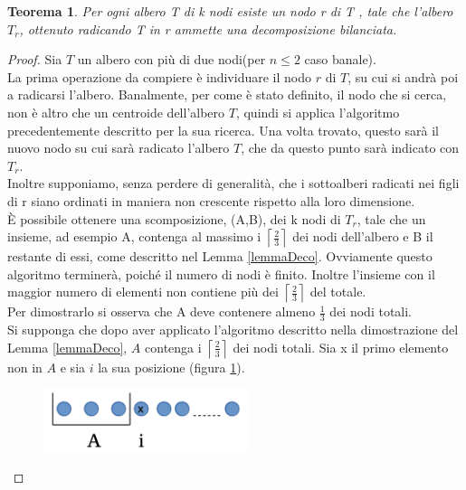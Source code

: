 \newtheorem{teorema1}[definizione]{Teorema}
\begin{teorema1}
Per ogni albero T di k nodi esiste un nodo r di T , tale che l'albero $T_r$, ottenuto radicando T in r ammette una decomposizione bilanciata.
\end{teorema1}
\begin{proof}
	Sia $ T $ un albero con pi\`u di due nodi(per $n\le2$ caso banale). \\
	La prima operazione da compiere \`e individuare il nodo $ r $ di $ T $, su cui si andr\`a poi a radicarsi l'albero.
	Banalmente, per come \`e stato definito, il nodo che si cerca, non \`e altro che  un centroide dell'albero $ T $, quindi si applica l’algoritmo precedentemente descritto per la sua ricerca.
	Una volta trovato, questo sar\`a il nuovo nodo su cui sar\`a radicato l'albero $ T $, che da questo punto sar\`a indicato con $T_r$.
	\\ 
	Inoltre supponiamo, senza perdere di generalit\`a, che i sottoalberi radicati nei figli di r siano ordinati in maniera non crescente rispetto alla loro dimensione.\\
	\`E possibile ottenere una scomposizione, (A,B), dei k nodi di $T_r$,  tale che un insieme, ad esempio A, contenga al massimo i $\left\lceil \frac{2}{3} \right\rceil$ dei nodi dell'albero e B il restante di essi, come descritto nel Lemma \ref{lemmaDeco}.
	Ovviamente questo algoritmo terminer\`a, poich\'e il numero di nodi \`e finito.
	Inoltre l'insieme con il maggior numero di elementi non contiene pi\`u dei $\left\lceil \frac{2}{3} \right\rceil$ del totale. \\
	Per dimostrarlo si osserva che A deve contenere almeno $\frac{1}{3}$ dei nodi totali. \\
	Si supponga che dopo aver applicato l'algoritmo descritto nella dimostrazione del Lemma \ref{lemmaDeco}, $ A $ contenga i  $ \left\lceil \frac{2}{3}\right\rceil $ dei nodi totali.
	Sia x il primo elemento non in $  A $ e sia $ i $ la sua posizione (figura \ref{fig:4}).
	\begin{figure}[htbp]
		\centering
		\includegraphics[width=6cm]{capitolo3/3}
		\caption{}
		\label{fig:4}
	\end{figure}
	

\end{proof}
